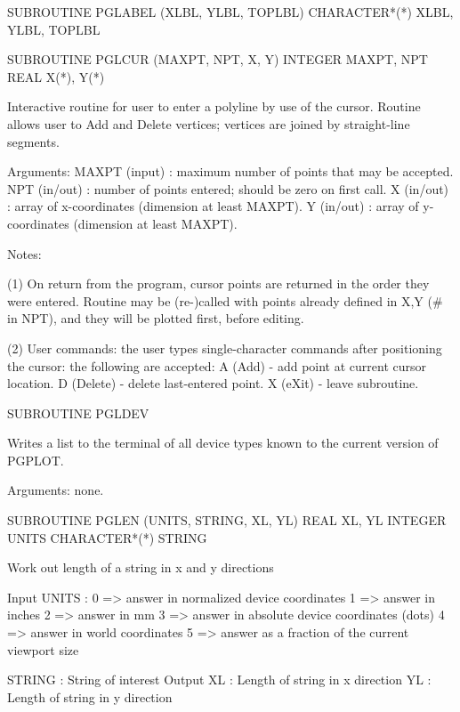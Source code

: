 {\eightpoint\begintt
      SUBROUTINE PGLABEL (XLBL, YLBL, TOPLBL)
      CHARACTER*(*) XLBL, YLBL, TOPLBL
\endtt}

{\eightpoint\begintt
      SUBROUTINE PGLCUR (MAXPT, NPT, X, Y)
      INTEGER MAXPT, NPT
      REAL    X(*), Y(*)
 
Interactive routine for user to enter a polyline by use of
the cursor.  Routine allows user to Add and Delete vertices;
vertices are joined by straight-line segments.
 
Arguments:
 MAXPT  (input)  : maximum number of points that may be accepted.
 NPT    (in/out) : number of points entered; should be zero on
                   first call.
 X      (in/out) : array of x-coordinates (dimension at least MAXPT).
 Y      (in/out) : array of y-coordinates (dimension at least MAXPT).
 
Notes:
 
(1) On return from the program, cursor points are returned in
the order they were entered. Routine may be (re-)called with points
already defined in X,Y (# in NPT), and they will be plotted
first, before editing.
 
(2) User commands: the user types single-character commands
after positioning the cursor: the following are accepted:
  A (Add)    - add point at current cursor location.
  D (Delete) - delete last-entered point.
  X (eXit)   - leave subroutine.
\endtt}

{\eightpoint\begintt
      SUBROUTINE PGLDEV
 
Writes a list to the terminal of all device types known to the
current version of PGPLOT.
 
Arguments: none.
\endtt}

{\eightpoint\begintt
      SUBROUTINE PGLEN (UNITS, STRING, XL, YL)
      REAL XL, YL
      INTEGER UNITS
      CHARACTER*(*) STRING
 
Work out length of a string in x and y directions 
 
Input
 UNITS    :  0 => answer in normalized device coordinates
             1 => answer in inches
             2 => answer in mm
             3 => answer in absolute device coordinates (dots)
             4 => answer in world coordinates
             5 => answer as a fraction of the current viewport size
 
 STRING   :  String of interest
Output
 XL       :  Length of string in x direction
 YL       :  Length of string in y direction
 
\endtt}

